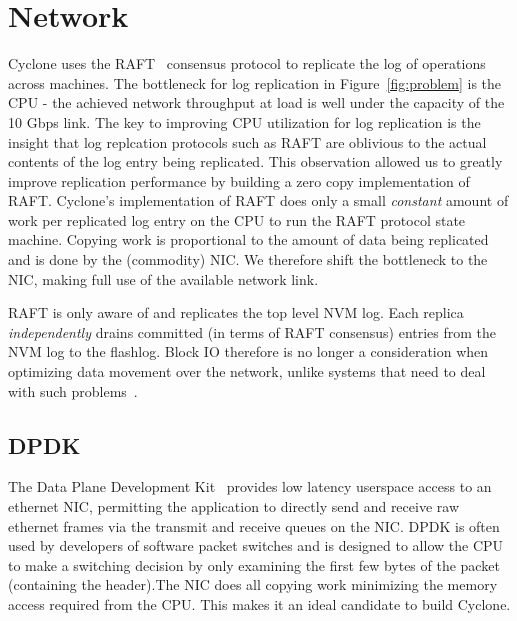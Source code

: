 \documentclass[letterpaper,twocolumn,10pt]{article}
\begin{document}
\section{Network}
\label{sec:network}
Cyclone uses the RAFT~\cite{raft} consensus protocol to replicate the
log of operations across machines. The bottleneck for log replication
in Figure~\ref{fig:problem} is the CPU - the achieved network
throughput at load is well under the capacity of the 10 Gbps link. The
key to improving CPU utilization for log replication is the insight
that log replcation protocols such as RAFT are oblivious to the actual
contents of the log entry being replicated.  This observation allowed
us to greatly improve replication performance by building a
zero copy implementation of RAFT. Cyclone's implementation of RAFT
does only a small \emph{constant} amount of work per replicated log
entry on the CPU to run the RAFT protocol state machine.  Copying work
is proportional to the amount of data being replicated and is done by
the (commodity) NIC.  We therefore shift the bottleneck to the NIC,
making full use of the available network link.

RAFT is only aware of and replicates the top level NVM log. Each
replica \emph{independently} drains committed (in terms of RAFT
consensus) entries from the NVM log to the flashlog. Block IO
therefore is no longer a consideration when optimizing data movement
over the network, unlike systems that need to deal with such
problems~\cite{reflex}. 

\subsection{DPDK}
\label{sec:netprot}
The Data Plane Development Kit~\cite{dpdk} provides low latency userspace access
to an ethernet NIC, permitting the application to directly send and receive raw
ethernet frames via the transmit and receive queues on the NIC. DPDK is often
used by developers of software packet switches and is designed to allow the CPU 
to make a switching decision by only examining the first few bytes of the packet 
(containing the header).The NIC does all copying work minimizing the memory access 
required from the CPU. This makes it an ideal candidate to build Cyclone.
\end{document}
